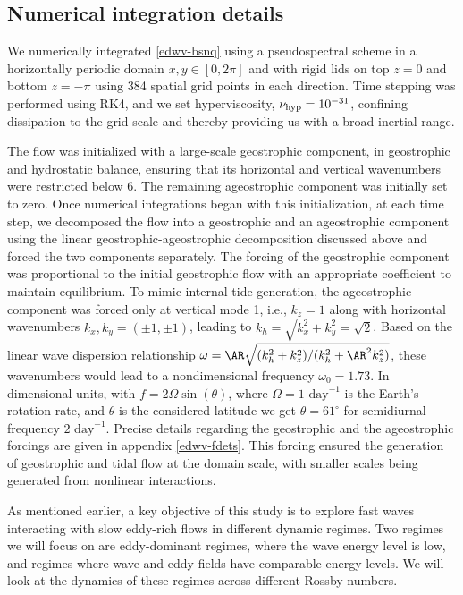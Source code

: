 \documentclass[../Rajarshi-thesis-draft.tex]{subfiles}
\begin{document}
\subsection{Numerical integration details} \label{edwv-intfrc}
We numerically integrated \eqref{edwv-bsnq} using a pseudospectral scheme in a horizontally periodic domain $x,y\in [0,2\pi]$ and with rigid lids on top $z=0$ and bottom $z=-\pi$ using 384 spatial grid points in each direction. Time stepping was performed using RK4, and we set hyperviscosity, $\nu_{\rm hyp} = 10^{-31}$, confining dissipation to the grid scale and thereby providing us with a broad inertial range.


The flow was initialized with a large-scale geostrophic component, in geostrophic and hydrostatic balance, ensuring that its horizontal and vertical wavenumbers were restricted below $6$. The remaining ageostrophic component was initially set to zero. %
Once numerical integrations began with this initialization, at each time step, we decomposed the flow into a geostrophic and an ageostrophic component using the linear geostrophic-ageostrophic decomposition discussed above and forced the two components separately. The forcing of the geostrophic component was proportional to the initial geostrophic flow with an appropriate coefficient to maintain equilibrium. 
To mimic internal tide generation, the ageostrophic component was forced only at vertical mode 1, i.e., $k_z = 1$ along with horizontal wavenumbers $k_x,k_y = (\pm 1,\pm 1)$, leading to $k_h = \sqrt{k_x^2 + k_y^2} = \sqrt{2}$. Based on the linear wave dispersion relationship $\omega = \AR \sqrt{(k_h^2 + k_z^2)/(k_h^2 + \AR^2 k_z^2)}$, these wavenumbers would lead to a nondimensional frequency $\omega_0 = 1.73$. In dimensional units, with $f = 2\Omega \sin(\theta)$, where $\Omega = 1 \text{ day}^{-1}$ is the Earth's rotation rate, and $\theta$ is the considered latitude we get $\theta = 61^{\circ}$ for semidiurnal frequency $2 \text{ day}^{-1}$. Precise details regarding the geostrophic and the ageostrophic forcings are given in appendix \ref{edwv-fdets}. This forcing ensured the generation of geostrophic and tidal flow at the domain scale, with smaller scales being generated from nonlinear interactions.


As mentioned earlier, a key objective of this study is to explore fast waves interacting with slow eddy-rich flows in different dynamic regimes. Two regimes we will focus on are eddy-dominant regimes, where the wave energy level is low,  and regimes where wave and eddy fields have comparable energy levels. We will look at the dynamics of these regimes across different Rossby numbers. 
\end{document}
